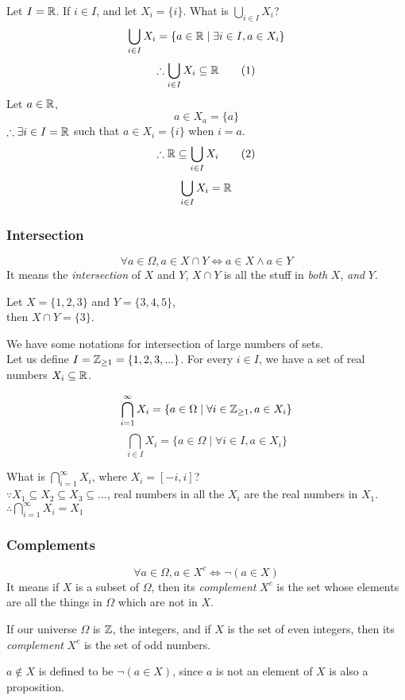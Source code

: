 \documentclass[a4paper]{article}
\begin{document}
\begin{eg}
Let $I = \mathbb{R}$.
If $i \in I$, and let $X_i = \{i\}$.
What is $\bigcup_{i \in I} X_i$?
$$\bigcup_{i \in I} X_i = \{a \in \mathbb{R} \mid \exists i \in I, a \in X_i\}$$
\[
	\therefore \bigcup_{i \in I} X_i \subseteq \mathbb{R} \tag{1}
\]
Let $a \in \mathbb{R}$,
\[
	a \in X_a = \{a\} \tag{by definition}
\]
$\therefore \exists i \in I = \mathbb{R}$ such that $a \in X_i = \{i\}$ when $i = a$.
\[
	\therefore \mathbb{R} \subseteq \bigcup_{i \in I} X_i \tag{2}
\]
$$\bigcup_{i \in I} X_i = \mathbb{R}$$
\end{eg}

\subsubsection{Intersection}
\begin{defi}[Intersection]
\[
	\forall a \in \Omega, a \in X \cap Y \iff a \in X \land a \in Y
\]
It means the \emph{intersection} of $X$ and $Y$, $X \cap Y$ is all the stuff in \emph{both} $X$, \emph{and} $Y$.
\end{defi}
\begin{eg}
Let $X = \{ 1, 2, 3 \}$ and $Y= \{ 3, 4, 5 \}$,\\
then $X \cap Y = \{ 3 \}$.
\end{eg}
We have some notations for intersection of large numbers of sets.\\
Let us define $I = \mathbb{Z}_{\geq1} = \{1,2,3,...\}$. For every $i \in I$, we have a set of real numbers $X_i \subseteq \mathbb{R}$.
\begin{notation}
$$\bigcap^\infty_{i=1} X_i = \{a \in \Omega \mid \forall i \in \mathbb{Z}_{\geq1}, a \in X_i\}$$
$$\bigcap_{i \in I} X_i = \{a \in \Omega \mid \forall i \in I, a \in X_i\}$$
\end{notation}

\begin{eg}
What is $\bigcap_{i=1}^\infty X_i$, where $X_i = [-i, i]$?\\
$\because X_1 \subseteq X_2 \subseteq X_3 \subseteq ...$, real numbers in all the $X_i$ are the real numbers in $X_1$.\\
$\therefore \bigcap_{i=1}^\infty X_i = X_1$
\end{eg}


\subsubsection{Complements}
\begin{defi}[Complements]
\[
	\forall a \in \Omega, a \in X^c \iff \lnot(a \in X)
\]
It means if $X$ is a subset of $\Omega$, then its \emph{complement} $X^c$ is the set whose elements are all the things in $\Omega$ which are not in $X$.
\end{defi}
\begin{eg}
If our universe $\Omega$ is $\mathbb{Z}$, the integers, and if $X$ is the set of even integers, then its \emph{complement} $X^c$ is the set of odd numbers.
\end{eg}
\begin{notation}
$a \notin X$ is defined to be $\lnot(a \in X)$, since $a$ is not an element of $X$ is also a proposition.
\end{notation}
\end{document}

